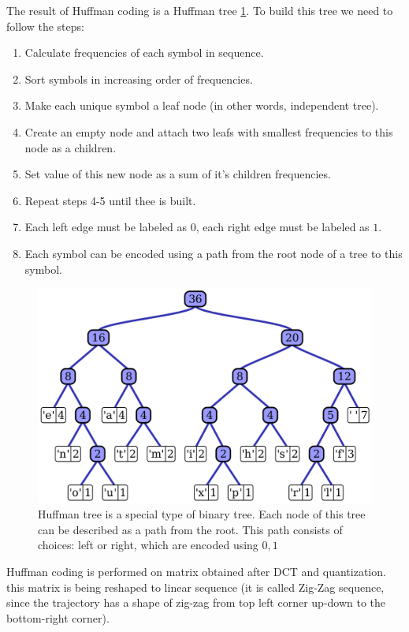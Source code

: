 The result of Huffman coding is a Huffman tree \ref{huffman-tree}. To build this tree we need to follow the steps:

\begin{enumerate}
    \item Calculate frequencies of each symbol in sequence.
    \item Sort symbols in increasing order of frequencies.
    \item Make each unique symbol a leaf node (in other words, independent tree).
    \item Create an empty node and attach two leafs with smallest frequencies to this node as a children.
    \item Set value of this new node as a sum of it's children frequencies.
    \item Repeat steps 4-5 until thee is built.
    \item Each left edge must be labeled as $0$, each right edge must be labeled as $1$.
    \item Each symbol can be encoded using a path from the root node of a tree to this symbol.
\end{enumerate}

\begin{figure}[!ht]
    \centering
    \includegraphics[width=\textwidth]{figure/Huffman_tree_2.svg.png}
    \caption{Huffman tree is a special type of binary tree. Each node of this tree can be described as a path from the root. This path consists of choices: left or right, which are encoded using ${0, 1}$}
    \label{huffman-tree}
\end{figure}

Huffman coding is performed on matrix obtained after DCT and quantization. this matrix is being reshaped to linear sequence (it is called Zig-Zag sequence, since the trajectory has a shape of zig-zag from top left corner up-down to the bottom-right corner).

